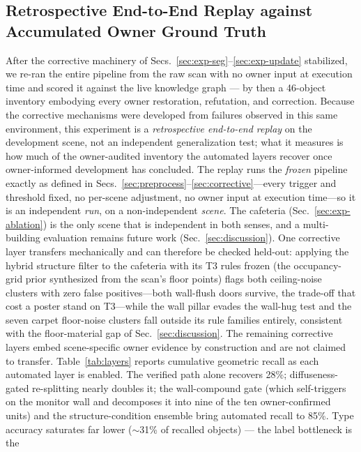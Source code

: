 \subsection{Retrospective End-to-End Replay against Accumulated Owner
Ground Truth}
\label{sec:exp-endtoend}

After the corrective machinery of Secs.~\ref{sec:exp-seg}--\ref{sec:exp-update}
stabilized, we re-ran the entire pipeline from the raw scan with no owner
input at execution time and scored it against the live knowledge graph ---
by then a 46-object inventory embodying every owner restoration,
refutation, and correction. Because the corrective mechanisms were
developed from failures observed in this same environment, this
experiment is a \emph{retrospective end-to-end replay} on the
development scene, not an independent generalization test; what it
measures is how much of the owner-audited inventory the automated
layers recover once owner-informed development has concluded. The
replay runs the \emph{frozen} pipeline exactly as defined in
Secs.~\ref{sec:preprocess}--\ref{sec:corrective}---every trigger and
threshold fixed, no per-scene adjustment, no owner input at execution
time---so it is an independent \emph{run}, on a non-independent
\emph{scene}. The cafeteria (Sec.~\ref{sec:exp-ablation}) is the only
scene that is independent in both senses, and a multi-building
evaluation remains future work
(Sec.~\ref{sec:discussion}). One
corrective layer transfers mechanically and can therefore be checked
held-out: applying the hybrid structure filter to the cafeteria with
its T3 rules frozen (the occupancy-grid prior synthesized from the
scan's floor points) flags both ceiling-noise clusters with zero false
positives---both wall-flush doors survive, the trade-off that cost a
poster stand on T3---while the wall pillar evades the wall-hug test
and the seven carpet floor-noise clusters fall outside its rule
families entirely, consistent with the floor-material gap of
Sec.~\ref{sec:discussion}. The remaining corrective layers embed
scene-specific owner evidence by construction and are not claimed to
transfer. Table~\ref{tab:layers} reports cumulative geometric recall as
each automated layer is enabled. The verified path alone recovers 28\%;
diffuseness-gated re-splitting nearly doubles it; the wall-compound gate
(which self-triggers on the monitor wall and decomposes it into nine of
the ten owner-confirmed units) and the structure-condition ensemble bring
automated recall to 85\%. Type accuracy saturates far lower
($\sim$31\% of recalled objects) --- the label bottleneck is the
